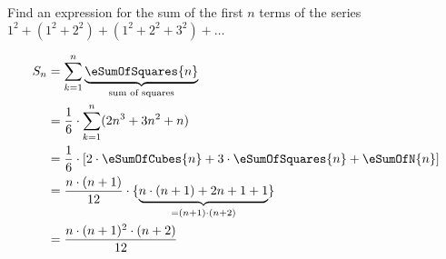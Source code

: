 
%
%
%
%
% 
% 

\question Find an expression for the sum of the first $n$ terms of the series 
$1^2 + (1^2+2^2) + (1^2+2^2+3^2) + \ldots$

\insertQR{}

\ifprintanswers
\fi 

\begin{solution}
	\begin{align}
		S_n &= \sum_{k=1}^{n}\underbrace{\eSumOfSquares{n}}_{\text{sum of squares}} \\
		&= \dfrac{1}{6}\cdot\sum_{k=1}^{n}(2n^3+3n^2+n) \\
		&= \dfrac{1}{6}\cdot\left[ 2\cdot\eSumOfCubes{n} + 3\cdot\eSumOfSquares{n} + \eSumOfN{n}\right] \\
		&= \dfrac{n\cdot(n+1)}{12}\cdot\lbrace\underbrace{n\cdot(n+1) + 2n + 1 + 1}_{=(n+1)\cdot(n+2)}\rbrace \\
		&= \dfrac{n\cdot(n+1)^2\cdot(n+2)}{12}
	\end{align}
\end{solution}
